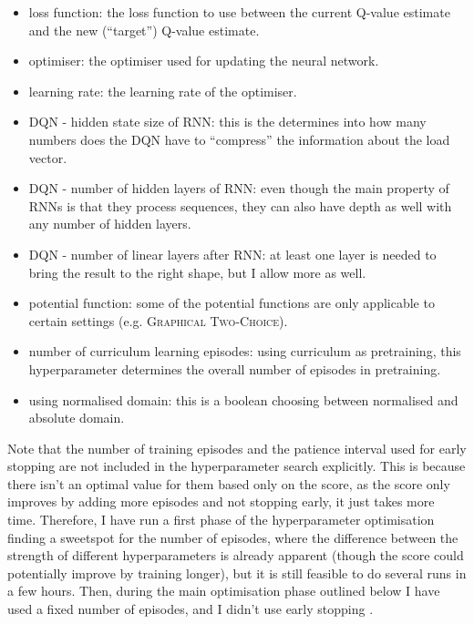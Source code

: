 \begin{itemize}
    \item loss function: the loss function to use between the current Q-value estimate and the new (``target'') Q-value estimate. 
    
    \item optimiser: the optimiser used for updating the neural network. 
    
    \item learning rate: the learning rate of the optimiser. 
    
    \item DQN - hidden state size of RNN: this is the determines into how many numbers does the DQN have to ``compress'' the information about the load vector.
    
    \item DQN - number of hidden layers of RNN: even though the main property of RNNs is that they process sequences, they can also have depth as well with any number of hidden layers.
    
    \item DQN - number of linear layers after RNN: at least one layer is needed to bring the result to the right shape, but I allow more as well.
    
    \item potential function: some of the potential functions are only applicable to certain settings (e.g. \textsc{Graphical Two-Choice}).
    
    \item number of curriculum learning episodes: using curriculum as pretraining, this hyperparameter determines the overall number of episodes in pretraining.
    
    \item using normalised domain: this is a boolean choosing between normalised and absolute domain.
    
    


\end{itemize}


Note that the number of training episodes and the patience interval used for early stopping are not included in the hyperparameter search explicitly. This is because there isn't an optimal value for them based only on the score, as the score only improves by adding more episodes and not stopping early, it just takes more time. Therefore, I have run a first phase of the hyperparameter optimisation finding a sweetspot for the number of episodes, where the difference between the strength of different hyperparameters is already apparent (though the score could potentially improve by training longer), but it is still feasible to do several runs in a few hours. Then, during the main optimisation phase outlined below I have used a fixed number of episodes, and I didn't use early stopping .



